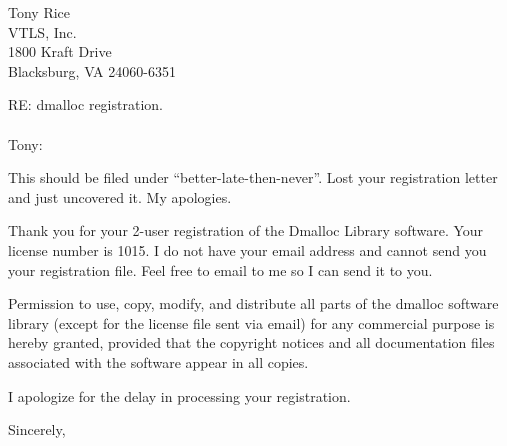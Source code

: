 

%
%

%
%
\address{Dmalloc Software \\
826 Savannah Ave. \\
Pittsburgh, PA  15221-3446 \\
1.412.244.8827}

\signature{Gray Watson \\
gray@letters.com}

\date{February 10, 1998}


\begin{letter}{Tony Rice \\
VTLS, Inc. \\
1800 Kraft Drive \\
Blacksburg, VA  24060-6351}

\opening{RE: dmalloc registration. \\
 \\
Tony:}

This should be filed under ``better-late-then-never''.  Lost your
registration letter and just uncovered it.  My apologies.

Thank you for your 
2-user registration of the Dmalloc Library software.  Your license
number is
1015.  I do not have your email address and cannot send you your
registration file.  Feel free to email to me so I can send it to you.

Permission to use, copy, modify, and distribute all parts of the
dmalloc software library (except for the license file sent via email)
for any commercial purpose is hereby granted, provided that the
copyright notices and all documentation files associated with the
software appear in all copies.

I apologize for the delay in processing your registration.

\closing{Sincerely,}

\end{letter}

